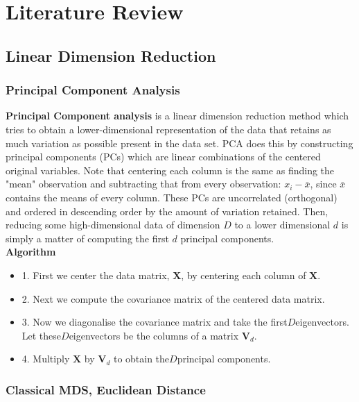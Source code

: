 \documentclass[12pt]{report}
\begin{document}
\chapter{Literature Review}

\section{Linear Dimension Reduction}

\subsection{Principal Component Analysis}

\textbf{Principal Component analysis} is a linear dimension reduction method 
which tries to obtain a lower-dimensional representation of the data 
that retains as much variation as possible present in the data set. 
PCA does this by constructing principal components (PCs) 
which are linear combinations of the centered original variables. 
Note that centering each column is the same as finding the "mean" 
observation and subtracting that from every observation: $x_i - \bar{x}$, 
since $\bar{x}$ contains the means of every column.
These PCs are uncorrelated (orthogonal) and ordered in descending order 
by the amount of variation retained. 
Then, reducing some high-dimensional data of dimension $D$ to a lower dimensional $d$ 
is simply a matter of computing the first $d$ principal components.\\
\textbf{Algorithm}
\begin{itemize}
    \item 1. First we center the data matrix, $\textbf{X}$, by centering each column of $\textbf{X}$.
    \item 2. Next we compute the covariance matrix of the centered data matrix.
    \item 3. Now we diagonalise the covariance matrix and take the first$D$eigenvectors. 
    Let these$D$eigenvectors be the columns of a matrix $\textbf{V}_d$.
    \item 4. Multiply $\textbf{X}$ by $\textbf{V}_d$ to obtain the$D$principal components.
\end{itemize}

\subsection{Classical MDS, Euclidean Distance}
\end{document}

